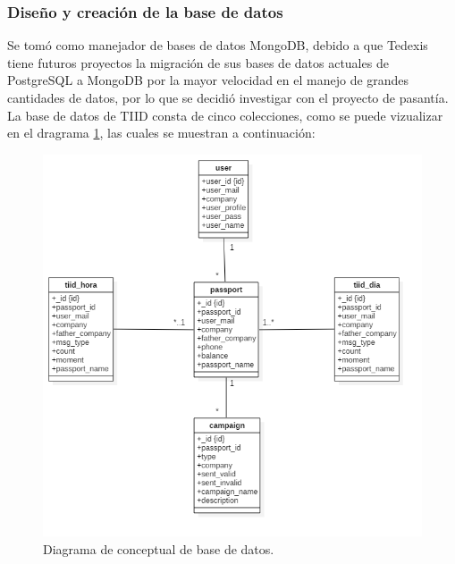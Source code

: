 \subsubsection{Diseño y creación de la base de datos}
\indent Se tomó como manejador de bases de datos MongoDB, debido a que Tedexis tiene futuros proyectos la migración de sus bases de datos actuales de PostgreSQL a MongoDB por la mayor velocidad en el manejo de grandes cantidades de datos, por lo que se decidió investigar con el proyecto de pasantía.
\newline
\newline
\indent La base de datos de TIID consta de cinco colecciones, como se puede vizualizar en el dragrama \ref{fig:bd}, las cuales se muestran a continuación:
\begin{figure}[ht]
  \centering
  \includegraphics[scale=0.50,type=png,ext=.png,read=.png]{imagenes/bd}
  \caption{Diagrama de conceptual de base de datos.}
  \label{fig:bd}
\end{figure}


